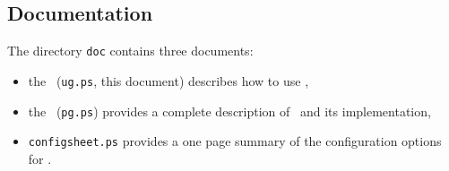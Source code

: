 \subsection{Documentation}
The directory {\tt doc} contains three documents:
\begin{itemize}
\item the \UG\ ({\tt ug.ps}, this document) describes how to use \NAMD, 
\item the \PG\ ({\tt pg.ps}) provides a complete description of \NAMD\ and 
  its implementation, 
\item {\tt configsheet.ps} provides a one page summary of the 
  configuration options for \NAMD.  
\end{itemize}

